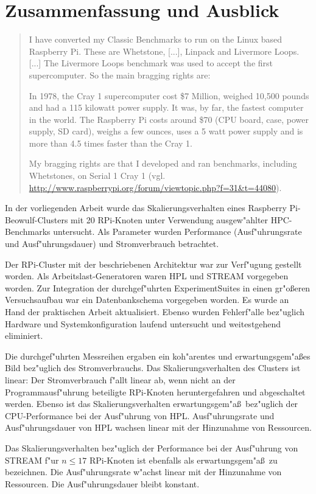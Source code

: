 \chapter{Zusammenfassung und Ausblick}\label{Kap5}
\begin{quote}
\onehalfspacing
I have converted my Classic Benchmarks to run on the Linux based Raspberry Pi. These are Whetstone, [...], Linpack and Livermore Loops. [...] The Livermore Loops benchmark was used to accept the first supercomputer. So the main bragging rights are:

In 1978, the Cray 1 supercomputer cost \$7 Million, weighed 10,500 pounds and had a 115 kilowatt power supply. It was, by far, the fastest computer in the world. The Raspberry Pi costs around \$70 (CPU board, case, power supply, SD card), weighs a few ounces, uses a 5 watt power supply and is more than 4.5 times faster than the Cray 1. 

My bragging rights are that I developed and ran benchmarks, including Whetstones, on Serial 1 Cray 1 (vgl. \url{http://www.raspberrypi.org/forum/viewtopic.php?f=31&t=44080}).
\end{quote}
In der vorliegenden Arbeit wurde das Skalierungsverhalten eines Raspberry Pi-Beowulf-Clusters mit 20 RPi-Knoten unter Verwendung ausgew"ahlter HPC-Benchmarks untersucht. Als Parameter wurden Performance (Ausf"uhrungsrate und Ausf"uhrungsdauer) und Stromverbrauch betrachtet. 

Der RPi-Cluster mit der beschriebenen Architektur war zur Verf"ugung gestellt worden. Als Arbeitslast-Generatoren waren HPL und STREAM vorgegeben worden. Zur Integration der durchgef"uhrten ExperimentSuites in einen gr"o\ss eren Versuchsaufbau war ein Datenbankschema vorgegeben worden. Es wurde an Hand der praktischen Arbeit aktualisiert. Ebenso wurden Fehlerf"alle bez"uglich Hardware und Systemkonfiguration laufend untersucht und weitestgehend eliminiert. 

Die durchgef"uhrten Messreihen ergaben ein koh"arentes und erwartungsgem"a\ss es Bild be\-z"ug\-lich des  Stromverbrauchs. Das Skalierungsverhalten des Clusters ist linear: Der Stromverbrauch f"allt linear ab, wenn nicht an der Programmausf"uhrung beteiligte RPi-Knoten heruntergefahren und abgeschaltet werden. Ebenso ist das Skalierungsverhalten erwartungsgem"a\ss\ bez"uglich der CPU-Performance bei der Ausf"uhrung von HPL. Ausf"uhrungsrate und Ausf"uhrungsdauer von HPL wachsen linear mit der Hinzunahme von Ressourcen. 

Das Skalierungsverhalten bez"uglich der Performance bei der Ausf"uhrung von STREAM f"ur $n\leq 17$ RPi-Knoten ist ebenfalls als erwartungsgem"a\ss\ zu bezeichnen. Die Ausf"uhrungsrate w"achst linear mit der Hinzunahme von Ressourcen. Die Ausf"uhrungsdauer bleibt konstant. 

